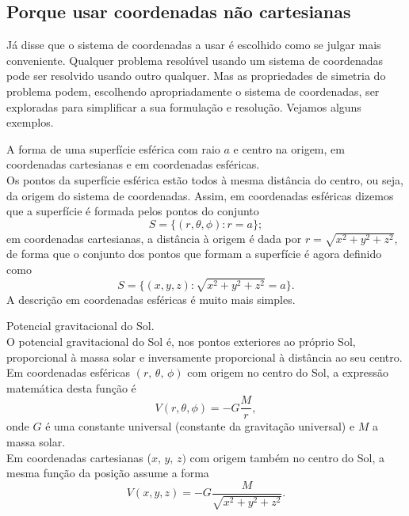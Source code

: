 \subsection*{Porque usar coordenadas não cartesianas}
Já disse que o sistema de coordenadas a usar é escolhido como se julgar mais
conveniente. Qualquer problema resolúvel usando um sistema de coordenadas pode
ser resolvido usando outro qualquer. Mas as propriedades de simetria do problema
podem, escolhendo apropriadamente o sistema de coordenadas, ser exploradas para
simplificar a sua formulação e resolução. Vejamos alguns exemplos.
\begin{examples}
\item A forma de uma superfície esférica com raio $a$ e centro na origem, em
  coordenadas cartesianas e em coordenadas esféricas.\\
  Os pontos da superfície esférica estão todos à mesma distância do centro, ou
  seja, da origem do sistema de coordenadas. Assim, em coordenadas esféricas
  dizemos que a superfície é formada pelos pontos do conjunto
  \begin{equation*}
    S=\{(r,\theta,\phi): r=a\};
  \end{equation*}
  em coordenadas cartesianas, a distância à origem é dada por
  $r=\sqrt{x^2+y^2+z^2}$, de forma que o conjunto dos pontos que formam a
  superfície é agora definido como
  \begin{equation*}
    S=\{(x,y,z): \sqrt{x^2+y^2+z^2}=a\}.
  \end{equation*}
  A descrição em coordenadas esféricas é muito mais simples.
\item
  Potencial gravitacional do Sol.\\
  O potencial gravitacional do Sol é, nos pontos exteriores ao próprio Sol,
  proporcional à massa solar e inversamente proporcional à distância ao seu
  centro. Em coordenadas esféricas $(r,\,\theta,\,\phi)$ com origem no centro do
  Sol, a expressão matemática desta função é
  \begin{equation*}
    V(r,\theta,\phi)=-G\frac{M}{r},
  \end{equation*}
  onde $G$ é uma constante universal (constante da gravitação universal) e $M$ a
  massa solar.\\
  Em coordenadas cartesianas ($x,\,y,\,z)$ com origem também no centro do Sol, a
  mesma função da posição assume a forma
  \begin{equation*}
    V(x,y,z)=-G\frac{M}{\sqrt{x^2+y^2+z^2}}.
  \end{equation*}

\end{examples}
